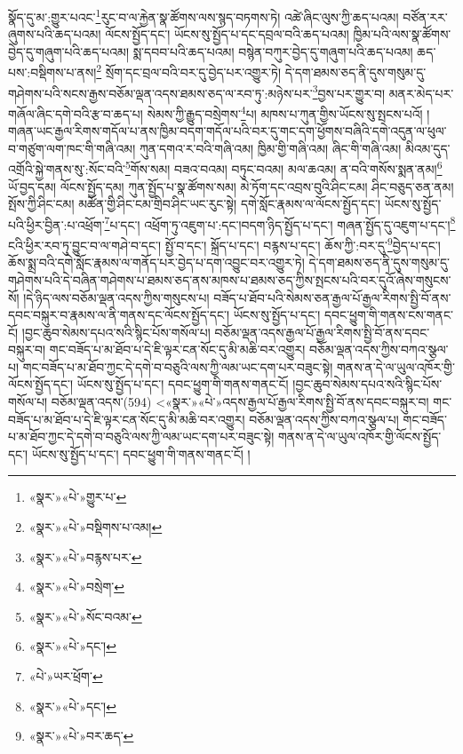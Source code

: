 སྣོད་དུ་མ་:གྱུར་པའང་\footnote{«སྣར་»«པེ་»གྱུར་པ་}རུང་བ་ལ་རྐྱེན་སྣ་ཚོགས་ལས་སྙད་བཏགས་ཏེ། འཚེ་ཞིང་ལུས་ཀྱི་ཆད་པའམ། བཙོན་རར་ཞུགས་པའི་ཆད་པའམ། ལོངས་སྤྱོད་དང་། ཡོངས་སུ་སྤྱོད་པ་དང་དབྲལ་བའི་ཆད་པའམ། ཁྱིམ་པའི་ལས་སྣ་ཚོགས་བྱེད་དུ་གཞུག་པའི་ཆད་པའམ། སྨ་དབབ་པའི་ཆད་པའམ། བསྙེན་བཀུར་བྱེད་དུ་གཞུག་པའི་ཆད་པའམ། ཆད་པས་:བསྡིགས་པ་ནས།\footnote{«སྣར་»«པེ་»བསྡིགས་པ་འམ།} སྲོག་དང་བྲལ་བའི་བར་དུ་བྱེད་པར་འགྱུར་ཏེ། དེ་དག་ཐམས་ཅད་ནི་དུས་གསུམ་དུ་གཤེགས་པའི་སངས་རྒྱས་བཅོམ་ལྡན་འདས་ཐམས་ཅད་ལ་རབ་ཏུ་:མཉེས་པར་\footnote{«སྣར་»«པེ་»བརྙས་པར་}བྱས་པར་གྱུར་བ། མནར་མེད་པར་གཞོལ་ཞིང་དགེ་བའི་རྩ་བ་ཆད་པ། སེམས་ཀྱི་རྒྱུད་བསྲེགས་\footnote{«སྣར་»«པེ་»བསྲེག་}པ། མཁས་པ་ཀུན་གྱིས་ཡོངས་སུ་སྤངས་པའོ། །གཞན་ཡང་རྒྱལ་རིགས་གདོལ་པ་ནས་ཁྱིམ་བདག་གདོལ་པའི་བར་དུ་གང་དག་ཕྱོགས་བཞིའི་དགེ་འདུན་ལ་ཕུལ་བ་གཙུག་ལག་ཁང་གི་གཞི་འམ། ཀུན་དགའ་ར་བའི་གཞི་འམ། ཁྱིམ་གྱི་གཞི་འམ། ཞིང་གི་གཞི་འམ། མིའམ་དུད་འགྲོའི་སྐྱེ་གནས་སུ་:སོང་བའི་\footnote{«སྣར་»«པེ་»སོང་བའམ་}གོས་སམ། བཟའ་བའམ། བཏུང་བའམ། མལ་ཆའམ། ན་བའི་གསོས་སྨན་ནམ།\footnote{«སྣར་»«པེ་»དང་།} ཡོ་བྱད་དམ། ལོངས་སྤྱོད་དམ། ཀུན་སྤྱོད་པ་སྣ་ཚོགས་སམ། མེ་ཏོག་དང་འབྲས་བུའི་ཤིང་ངམ། ཤིང་བཅུད་ཅན་ནམ། སྤོས་ཀྱི་ཤིང་ངམ། མཚོན་གྱི་ཤིང་ངམ་གྲིབ་ཤིང་ཡང་རུང་སྟེ། དགེ་སློང་རྣམས་ལ་ལོངས་སྤྱོད་དང་། ཡོངས་སུ་སྤྱོད་པའི་ཕྱིར་བྱིན་:པ་འཕྲོག་\footnote{«པེ་»ཡར་ཕྲོག་}པ་དང་། འཕྲོག་ཏུ་འཇུག་པ་:དང་།བདག་ཉིད་སྤྱོད་པ་དང་། གཞན་སྤྱོད་དུ་འཇུག་པ་དང་།\footnote{«སྣར་»«པེ་»དང་།} ངའི་ཕྱིར་རབ་ཏུ་བྱུང་བ་ལ་གཤེ་བ་དང་། སྤྱོ་བ་དང་། སྐྲོད་པ་དང་། བརྙས་པ་དང་། ཆོས་ཀྱི་:བར་དུ་\footnote{«སྣར་»«པེ་»བར་ཆད་}བྱེད་པ་དང་། ཆོས་སྨྲ་བའི་དགེ་སློང་རྣམས་ལ་གནོད་པར་བྱེད་པ་དག་འབྱུང་བར་འགྱུར་ཏེ། དེ་དག་ཐམས་ཅད་ནི་དུས་གསུམ་དུ་གཤེགས་པའི་དེ་བཞིན་གཤེགས་པ་ཐམས་ཅད་ནས་མཁས་པ་ཐམས་ཅད་ཀྱིས་སྤངས་པའི་བར་དུའོ་ཞེས་གསུངས་སོ། །དེ་ཉིད་ལས་བཅོམ་ལྡན་འདས་ཀྱིས་གསུངས་པ། བཟོད་པ་ཐོབ་པའི་སེམས་ཅན་རྒྱལ་པོ་རྒྱལ་རིགས་སྤྱི་བོ་ནས་དབང་བསྐུར་བ་རྣམས་ལ་ནི་གནས་དང་ལོངས་སྤྱོད་དང་། ཡོངས་སུ་སྤྱོད་པ་དང་། དབང་ཕྱུག་གི་གནས་ངས་གནང་ངོ། །བྱང་ཆུབ་སེམས་དཔའ་སའི་སྙིང་པོས་གསོལ་པ། བཅོམ་ལྡན་འདས་རྒྱལ་པོ་རྒྱལ་རིགས་སྤྱི་བོ་ནས་དབང་བསྐུར་བ། གང་བཟོད་པ་མ་ཐོབ་པ་དེ་ཇི་ལྟར་ངན་སོང་དུ་མི་མཆི་བར་འགྱུར། བཅོམ་ལྡན་འདས་ཀྱིས་བཀའ་སྩལ་པ། གང་བཟོད་པ་མ་ཐོབ་ཀྱང་དེ་དགེ་བ་བཅུའི་ལས་ཀྱི་ལམ་ཡང་དག་པར་བཟུང་སྟེ། གནས་ན་དེ་ལ་ཡུལ་འཁོར་གྱི་ལོངས་སྤྱོད་དང་། ཡོངས་སུ་སྤྱོད་པ་དང་། དབང་ཕྱུག་གི་གནས་གནང་ངོ། །བྱང་ཆུབ་སེམས་དཔའ་སའི་སྙིང་པོས་གསོལ་པ། བཅོམ་ལྡན་འདས་(594) <«སྣར་»«པེ་»འདས་རྒྱལ་པོ་རྒྱལ་རིགས་སྤྱི་བོ་ནས་དབང་བསྐུར་བ། གང་བཟོད་པ་མ་ཐོབ་པ་དེ་ཇི་ལྟར་ངན་སོང་དུ་མི་མཆི་བར་འགྱུར། བཅོམ་ལྡན་འདས་ཀྱིས་བཀའ་སྩལ་པ། གང་བཟོད་པ་མ་ཐོབ་ཀྱང་དེ་དགེ་བ་བཅུའི་ལས་ཀྱི་ལམ་ཡང་དག་པར་བཟུང་སྟེ། གནས་ན་དེ་ལ་ཡུལ་འཁོར་གྱི་ལོངས་སྤྱོད་དང་། ཡོངས་སུ་སྤྱོད་པ་དང་། དབང་ཕྱུག་གི་གནས་གནང་ངོ། །
